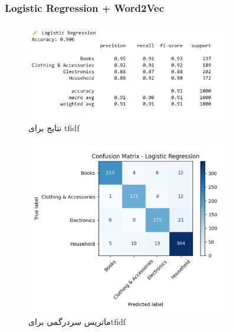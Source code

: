 \documentclass[a4paper,12pt]{article}
\begin{document}
\subsubsection*{Logistic Regression + Word2Vec}
\begin{figure}[H]
    \centering
    \includegraphics[width=0.8\textwidth]{lrWord2vec.png}
    \caption*{نتایج برای tfidf}
    \label{fig:yourlabel}
\end{figure}
\begin{figure}[H]
    \centering
    \includegraphics[width=0.8\textwidth]{word2vecConfusionMatrix.png}
    \caption*{ماتریس سردرگمی برایtfidf }
    \label{fig:yourlabel}
\end{figure}
\end{document}
